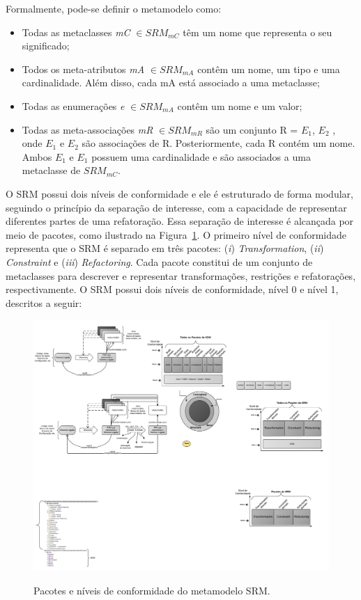 Formalmente, pode-se definir o metamodelo como:

\begin{itemize}
	\item Todas as metaclasses \textit{mC} $\in SRM_{mC}$ têm um nome que representa o seu significado;
	\item Todos os meta-atributos \textit{mA} $\in SRM_{mA}$ contêm um nome, um tipo e uma cardinalidade. Além disso, cada mA está associado a uma metaclasse;
	\item Todas as enumerações \textit{e} $\in SRM_{mA}$ contêm um nome e um valor;
	\item Todas as meta-associações \textit{mR} $\in SRM_{mR}$ são um conjunto R = $E_{1}$, $E_{2}$  , onde  $E_{1}$ e $E_{2}$ são associações de R. Posteriormente, cada R contém um nome. Ambos $E_{1}$  e $E_{1}$ possuem uma cardinalidade e são associados a uma metaclasse de $SRM_{mC}$.
\end{itemize}

O SRM possui dois níveis de conformidade e ele é estruturado de forma modular, seguindo o princípio da separação de interesse, com a capacidade de representar diferentes partes de uma refatoração. Essa separação de interesse é alcançada por meio de pacotes, como ilustrado na Figura~\ref{fig:pacotes_SRM_conformidade_level}. O primeiro nível de conformidade representa que o SRM é separado em três pacotes: (\textit{i}) \textit{Transformation}, (\textit{ii}) \textit{Constraint} e (\textit{iii}) \textit{Refactoring}. Cada pacote constitui de um conjunto de metaclasses para descrever e representar transformações, restrições e refatorações, respectivamente. O SRM possui dois níveis de conformidade, nível 0 e nível 1, descritos a seguir:

\begin{figure}[h]
	\centering
		\caption{Pacotes e níveis de conformidade do metamodelo SRM.}
	\includegraphics[scale=1]{images/conformidadeSRM}
	\label{fig:pacotes_SRM_conformidade_level}
	\fautor
\end{figure}

